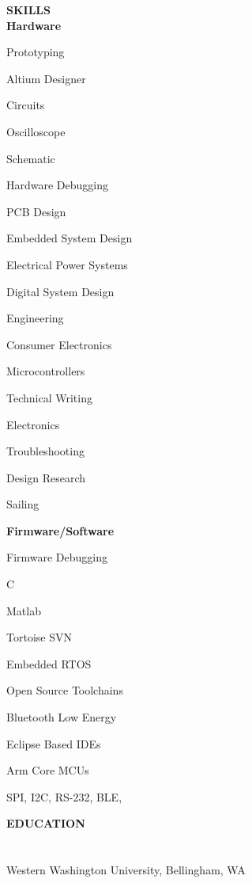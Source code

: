 \documentclass[10pt,letterpaper]{article}
\begin{document}
{\noindent\sc\bf SKILLS}\vspace{.5pc}\\ 
{\indent\indent\sc\bf Hardware}
 \begin{multicols}{3}
\begin{itemize}[leftmargin=0.75in, rightmargin=0.25in, topsep=0in, itemindent=0in, label=\textrm{--}]
 {\small\sl
\item Prototyping
\item Altium Designer
\item Circuits
\item Oscilloscope
\item Schematic
\item Hardware Debugging
\item PCB Design
\item Embedded System Design
\item Electrical Power Systems
\item Digital System Design
\item Engineering
\item Consumer Electronics
\item Microcontrollers
\item Technical Writing
\item Electronics
\item Troubleshooting
\item Design Research
\item Sailing
}
\end{itemize}
\end{multicols}
{\indent\indent\sc\bf Firmware/Software}
 \begin{multicols}{3}
 \begin{itemize}[leftmargin=0.75in, rightmargin=0.25in, topsep=0mm,itemindent=0mm, label=\textrm{--}]
  {\small\sl
\item Firmware Debugging
\item C
\item Matlab
\item Tortoise SVN
\item Embedded RTOS
\item Open Source Toolchains
\item Bluetooth Low Energy
\item Eclipse Based IDEs
\item Arm Core MCUs
\item SPI, I2C, RS-232, BLE, 
}
\end{itemize}
\end{multicols}

\vspace*{\fill}

{\noindent\sc\bf EDUCATION}\vspace{.5pc}\\
	\indent{}\hspace*{\fill}{ June 2017}\\
	\indent{} \\
   \indent\indent  Western Washington University, Bellingham, WA%
\end{document}

